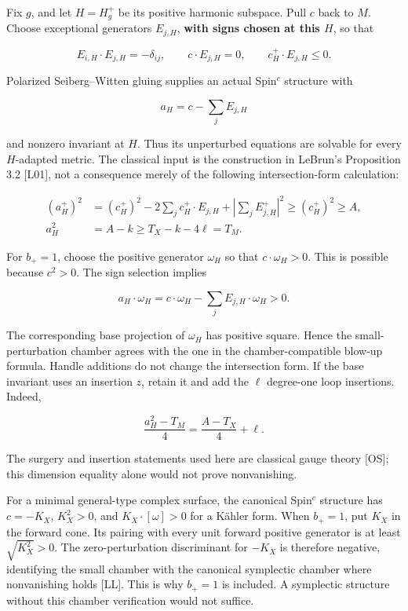 \documentclass[
  10pt,
]{article}
\begin{document}
Fix \(g\), and let \(H=H_g^+\) be its positive harmonic subspace. Pull
\(c\) back to \(M\). Choose exceptional generators \(E_{j,H}\),
\textbf{with signs chosen at this \(H\)}, so that

\[
E_{i,H}\cdot E_{j,H}=-\delta_{ij},\qquad
c\cdot E_{j,H}=0,\qquad c_H^+\cdot E_{j,H}\le0.
\]

Polarized Seiberg--Witten gluing supplies an actual Spin\(^c\) structure
with

\[
a_H=c-\sum_j E_{j,H}                                  \tag{3}
\]

and nonzero invariant at \(H\). Thus its unperturbed equations are
solvable for every \(H\)-adapted metric. The classical input is the
construction in LeBrun's Proposition 3.2 {[}L01{]}, not a consequence
merely of the following intersection-form calculation:

\[
\begin{aligned}
(a_H^+)^2
 &=(c_H^+)^2-2\sum_j c_H^+\cdot E_{j,H}
                  +\left|\sum_j E_{j,H}^+\right|^2
 \ge(c_H^+)^2\ge A,\\
a_H^2&=A-k\ge T_X-k-4\ell=T_M.
\end{aligned}                                           \tag{4}
\]

For \(b_+=1\), choose the positive generator \(\omega_H\) so that
\(c\cdot\omega_H>0\). This is possible because \(c^2>0\). The sign
selection implies

\[
a_H\cdot\omega_H=c\cdot\omega_H-\sum_j E_{j,H}\cdot\omega_H>0.
\]

The corresponding base projection of \(\omega_H\) has positive square.
Hence the small-perturbation chamber agrees with the one in the
chamber-compatible blow-up formula. Handle additions do not change the
intersection form. If the base invariant uses an insertion \(z\), retain
it and add the \(\ell\) degree-one loop insertions. Indeed,

\[
\frac{a_H^2-T_M}{4}=\frac{A-T_X}{4}+\ell.
\]

The surgery and insertion statements used here are classical gauge
theory {[}OS{]}; this dimension equality alone would not prove
nonvanishing.

For a minimal general-type complex surface, the canonical Spin\(^c\)
structure has \(c=-K_X\), \(K_X^2>0\), and \(K_X\cdot[\omega]>0\) for a
Kähler form. When \(b_+=1\), put \(K_X\) in the forward cone. Its
pairing with every unit forward positive generator is at least
\(\sqrt{K_X^2}>0\). The zero-perturbation discriminant for \(-K_X\) is
therefore negative, identifying the small chamber with the canonical
symplectic chamber where nonvanishing holds {[}LL{]}. This is why
\(b_+=1\) is included. A symplectic structure without this chamber
verification would not suffice.
\end{document}
